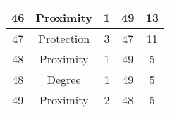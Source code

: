 \documentclass[results.tex]{subfiles}
\begin{document}
\begin{center}
\begin{tabular}{| c || c | c | c | c |}
            \hline
            46                      & Proximity                    & 1                      & 49                      & 13                   \\
            \hline
            47                      & Protection                   & 3                      & 47                      & 11                   \\
            \hline
            48                      & Proximity                    & 1                      & 49                      & 5                    \\
            \hline
            48                      & Degree                       & 1                      & 49                      & 5                    \\
            \hline
            49                      & Proximity                    & 2                      & 48                      & 5                    \\
            \hline
        \end{tabular}
    \end{center}
\end{document}

